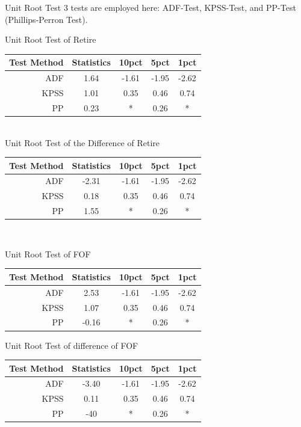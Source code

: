 \documentclass{beamer}
\begin{document}
\begin{frame}{Unit Root Test}
	3 tests are employed here: ADF-Test, KPSS-Test, and PP-Test (Phillips-Perron Test).

	Unit Root Test of Retire\\
	\par
	\begin{tabular}{|r |c |c |c| c|}
		\hline
		Test Method&Statistics & 10pct & 5pct & 1pct \\  \hline
		ADF & 1.64 &-1.61 & -1.95&-2.62 \\  \hline
		KPSS & 1.01 & 0.35 & 0.46 & 0.74 \\  \hline
		PP & 0.23 & *  &0.26 & *\\  \hline
	\end{tabular}
	\\
	\bigskip
	Unit Root Test of the Difference of Retire \\
	\begin{tabular}{|r |c |c |c| c|}
		\hline
		Test Method&Statistics & 10pct & 5pct & 1pct \\  \hline
		ADF & -2.31 &-1.61 & -1.95&-2.62 \\  \hline
		KPSS & 0.18 & 0.35 & 0.46 & 0.74 \\  \hline
		PP & 1.55 & *  &0.26 & *\\  \hline
	\end{tabular}	
	\\
	\bigskip
	\par
	Unit Root Test of FOF \\
	\begin{tabular}{|r |c |c |c| c|}
		\hline
		Test Method&Statistics & 10pct & 5pct & 1pct \\  \hline
		ADF & 2.53 &-1.61 & -1.95&-2.62 \\  \hline
		KPSS & 1.07 & 0.35 & 0.46 & 0.74 \\  \hline
		PP & -0.16 & *  &0.26 & *\\  \hline
	\end{tabular}
	\par
	Unit Root Test of difference of FOF \\
	\begin{tabular}{|r |c |c |c| c|}
		\hline
		Test Method&Statistics & 10pct & 5pct & 1pct \\  \hline
		ADF & -3.40 &-1.61 & -1.95&-2.62 \\  \hline
		KPSS & 0.11 & 0.35 & 0.46 & 0.74 \\  \hline
		PP & -40 & *  &0.26 & *\\  \hline
	\end{tabular}

\end{frame}
\end{document}
